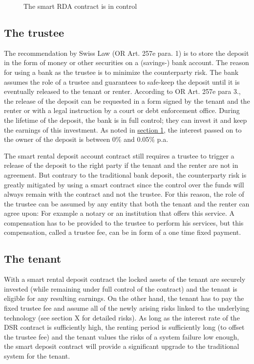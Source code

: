 \documentclass[12pt,a4paper,titlepage,oneside,english]{article}
\begin{document}
\begin{figure}[h]
\caption{The smart RDA contract is in control}
\label{fig:contract}
\end{figure}

\subsection{The trustee}
The recommendation by Swiss Law (OR Art. 257e para. 1) is to store the deposit in the form of money or other securities on a (savings-) bank account. The reason for using a bank as the trustee is to minimize the counterparty risk. The bank assumes the role of a trustee and guarantees to safe-keep the deposit until it is eventually released to the tenant or renter. According to OR Art. 257e para 3., the release of the deposit can be requested in a form signed by the tenant and the renter or with a legal instruction by a court or debt enforcement office. During the lifetime of the deposit, the bank is in full control; they can invest it and keep the earnings of this investment. As noted in \hyperref[sec:introduction]{section 1}, the interest passed on to the owner of the deposit is between 0\% and 0.05\% p.a. 

The smart rental deposit account contract still requires a trustee to trigger a release of the deposit to the right party if the tenant and the renter are not in agreement. But contrary to the traditional bank deposit, the counterparty risk is greatly mitigated by using a smart contract since the control over the funds will always remain with the contract and not the trustee.
For this reason, the role of the trustee can be assumed by any entity that both the tenant and the renter can agree upon: For example a notary or an institution that offers this service. A compensation has to be provided to the trustee to perform his services, but this compensation, called a trustee fee, can be in form of a one time fixed payment.

\subsection{The tenant}
With a smart rental deposit contract the locked assets of the tenant are securely invested (while remaining under full control of the contract) and the tenant is eligible for any resulting earnings. On the other hand, the tenant has to pay the fixed trustee fee and assume all of the newly arising risks linked to the underlying technology (see section X for detailed risks). As long as the interest rate of the DSR contract is sufficiently high, the renting period is sufficiently long (to offset the trustee fee) and the tenant values the risks of a system failure low enough, the smart deposit contract will provide a significant upgrade to the traditional system for the tenant.
\end{document}

